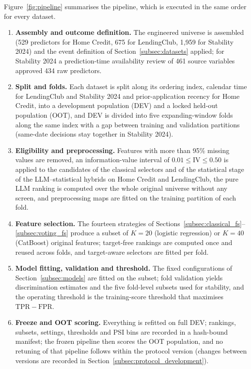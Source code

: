 \documentclass[final,5p,twocolumn]{elsarticle}
\newcommand{\Kfeat}{K}
\newcommand{\TPR}{\mathrm{TPR}}
\newcommand{\FPR}{\mathrm{FPR}}
\begin{document}
Figure~\ref{fig:pipeline} summarises the pipeline, which is executed in the same order for every dataset.
\begin{enumerate}
    \item \textbf{Assembly and outcome definition.} The engineered universe is assembled (529 predictors for Home Credit, 675 for LendingClub, 1,959 for Stability 2024) and the event definition of Section~\ref{subsec:datasets} applied; for Stability 2024 a prediction-time availability review of 461 source variables approved 434 raw predictors.
    \item \textbf{Split and folds.} Each dataset is split along its ordering index, calendar time for LendingClub and Stability 2024 and prior-application recency for Home Credit, into a development population (DEV) and a locked held-out population (OOT), and DEV is divided into five expanding-window folds along the same index with a gap between training and validation partitions (same-date decisions stay together in Stability 2024).
    \item \textbf{Eligibility and preprocessing.} Features with more than 95\% missing values are removed, an information-value interval of $0.01\le\mathrm{IV}\le0.50$ is applied to the candidates of the classical selectors and of the statistical stage of the LLM--statistical hybrids on Home Credit and LendingClub, the pure LLM ranking is computed over the whole original universe without any screen, and preprocessing maps are fitted on the training partition of each fold.
    \item \textbf{Feature selection.} The fourteen strategies of Sections~\ref{subsec:classical_fs}--\ref{subsec:voting_fs} produce a subset of $\Kfeat=20$ (logistic regression) or $\Kfeat=40$ (CatBoost) original features; target-free rankings are computed once and reused across folds, and target-aware selectors are fitted per fold.
    \item \textbf{Model fitting, validation and threshold.} The fixed configurations of Section~\ref{subsec:models} are fitted on the subset; fold validation yields discrimination estimates and the five fold-level subsets used for stability, and the operating threshold is the training-score threshold that maximises $\TPR-\FPR$.
    \item \textbf{Freeze and OOT scoring.} Everything is refitted on full DEV; rankings, subsets, settings, thresholds and PSI bins are recorded in a hash-bound manifest; the frozen pipeline then scores the OOT population, and no retuning of that pipeline follows within the protocol version (changes between versions are recorded in Section~\ref{subsec:protocol_development}).
\end{enumerate}
\end{document}
